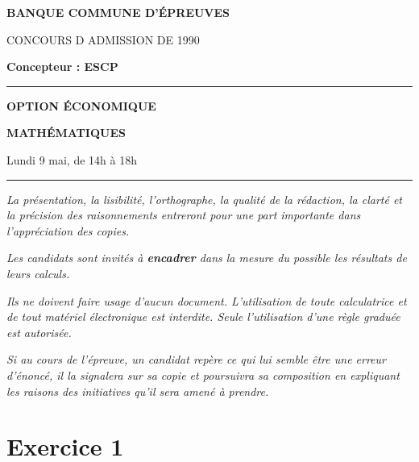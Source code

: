 \documentclass[11pt]{article}%
\begin{document}

\begin{center}
{\LARG\E\textbf{BANQUE COMMUNE D'ÉPREUVES}}



{\large \textsc{CONCOURS D ADMISSION DE 1990}}



{\large \textbf{Concepteur : ESCP}}



\rule{2.39cm}{0.05cm}



{\Large \textbf{OPTION ÉCONOMIQUE}}



{\Large \textbf{MATHÉMATIQUES }}



{\Large Lundi 9 mai, de 14h à 18h}



\rule{2.39cm}{0.05cm}
\end{center}

\textit{La présentation, la lisibilité, l'orthographe, la qualité
de la rédaction, la clarté et la précision des raisonnements
entreront pour une part importante dans l'appréciation des copies.}

\textit{Les candidats sont invités à \textbf{encadrer} dans la mesure
du possible les résultats de leurs calculs.}

\textit{Ils ne doivent faire usage d'aucun document. L'utilisation de
toute
calculatrice et de tout matériel électronique est interdite. Seule
l'utilisation d'une règle graduée est autorisée.}

\textit{Si au cours de l'épreuve, un candidat repère ce qui lui semble
être une erreur d'énoncé, il la signalera sur sa copie et
poursuivra sa composition en expliquant les raisons des initiatives
qu'il sera
amené à prendre.}

\vspace*{3cm}

\section*{Exercice 1}
\end{document}
